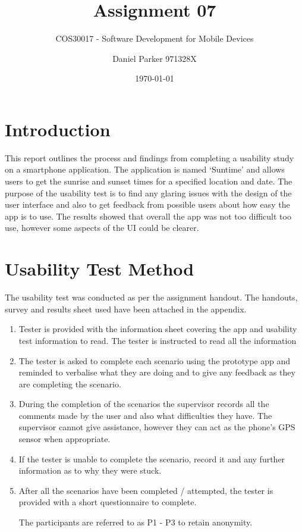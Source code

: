 \documentclass[11pt,english,numbers=endperiod,parskip=half]{scrartcl}
\title{Assignment 07}
\subtitle{COS30017 - Software Development for Mobile Devices}
\author{Daniel Parker 971328X}
\date{\today}
\begin{document}
\maketitle
\thispagestyle{empty}

\section{Introduction}
	This report outlines the process and findings from completing a usability study
	on a smartphone application. The application is named `Suntime' and allows users
	to get the sunrise and sunset times for a specified location and date. The
	purpose of the usability test is to find any glaring issues with the design of
	the user interface and also to get feedback from possible users about how easy
	the app is to use. The results showed that overall the app was not too
	difficult	too use, however some aspects of the UI could be clearer.
\section{Usability Test Method}
	The usability test was conducted as per the assignment handout. The handouts,
	survey and results sheet used have been attached in the appendix.

	\begin{enumerate}
		\item{
			Tester is provided with the information sheet covering the app
			and usability test information to read. The tester is instructed to read all
			the information
		}

		\item{
			The tester is asked to complete each scenario using the prototype app and
			reminded to verbalise what they are doing and to give any feedback as they
			are completing the scenario.
		}

		\item{
			During the completion of the scenarios the supervisor records all the
			comments made by the user and also what difficulties they have. The
			supervisor cannot give assistance, however they can act as the phone's
			GPS sensor when appropriate.
		}

		\item{
			If the tester is unable to complete the scenario, record it and any further
			information as to why they were stuck.
		}

		\item{
			After all the scenarios have been completed / attempted, the tester is
			provided with a short questionnaire to complete.
		}

		The participants are referred to as P1 - P3 to retain anonymity.
	\end{enumerate}
\end{document}
